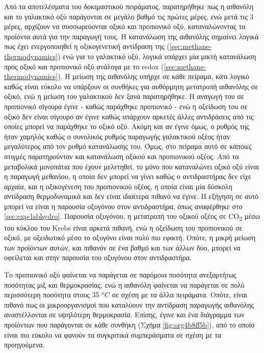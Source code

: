 \documentclass[11pt]{report}
\begin{document}
Από τα αποτελέσματα του δοκιμαστικού πειράματος, παρατηρήθηκε πως η αιθανόλη και το γαλακτικό οξύ παράγονται σε μεγάλο βαθμό τις πρώτες μέρες, ενώ μετά τις 3 μέρες, αρχίζουν να συσσωρεύονται οξικό και προπιονικό οξύ, καταναλώνοντας τα προϊόντα αυτά για την παραγωγή τους. Η κατανάλωση της αιθανόλης σημαίνει λογικά πως έχει ενεργοποιηθεί η οξικογενετική αντίδραση της (\autoref{sec:methane-thermodynamics}) ενώ για το γαλακτικό οξύ, λογικά υπάρχει μία μικτή κατανάλωση προς οξικό και προπιονικό οξύ ανάλογα με το \acrshort{redox} (\autoref{sec:methane-thermodynamics}). Η μείωση της αιθανόλης υπήρχε σε κάθε πείραμα, κάτι λογικό καθώς είναι εύκολο να υπάρξουν οι συνθήκες για αυθόρμητη μετατροπή αιθανόλης σε οξικό, ενώ η μείωση του γαλακτικού δεν ξανά παρατηρήθηκε. Η αναγωγή του σε προπιονικό σίγουρα έγινε - καθώς παράχθηκε προπιονικό - ενώ η οξείδωση του σε οξικό δεν είναι σίγουρο αν έγινε καθώς υπάρχουν αρκετές άλλες αντιδράσεις από τις οποίες μπορεί να παράχθηκε το οξικό οξύ. Ακόμη και αν έγινε όμως, ο ρυθμός της ήταν χαμηλός καθώς ο συνολικός ρυθμός παραγωγής γαλακτικού οξέος ήταν μεγαλύτερος από τον ρυθμό κατανάλωσης του. Όμως, στο πείραμα αυτό σε κάποιες στιγμές παρατηρούνταν και κατανάλωση οξικού και προπιονικού οξέος. Από τα μεταβολικά μονοπάτια που έχουν μελετηθεί, το μόνο που καταναλώνει οξικό οξύ είναι η παραγωγή μεθανίου, η οποία δεν μπορεί να γίνει καθώς ο αντιδραστήρας δεν είχε αρχαία, και η οξικογένεση του προπιονικού οξέος, η οποία είναι μία δύσκολη αντίδραση θερμοδυναμικά και δεν είναι ιδιαίτερα πιθανό να έγινε. Η εξήγηση σε αυτό μπορεί να είναι η παρουσία οξυγόνου στον αντιδραστήρα, όπως αναφέρθηκε στο \autoref{sec:exp-labhydro}. Παρουσία οξυγόνου, η μετατροπή του οξικού οξέος σε CO\textsubscript{2} μέσω του κύκλου του Krebs είναι αρκετά πιθανή, ενώ η οξείδωση του προπιονικού σε οξικό, με οξειδωτικό μέσο το οξυγόνο είναι πολύ πιο εφικτή. Οπότε, η μικρή μείωση των προϊόντων αυτών, και πιθανόν σε ένα βαθμό και των άλλων δύο, μπορεί να οφείλεται και στην παρουσία του οξυγόνου στον αντιδραστήρα.

Το προπιονικό οξύ φαίνεται να παράγεται σε παρόμοια ποσότητα ανεξαρτήτως ποσότητας μιξ και θερμοκρασίας, ενώ η αιθανόλη φαίνεται να παράγεται σε πολύ περισσότερη ποσότητα στους 35 \(^oC\) σε σχέση με τα άλλα πειράματα. Οπότε, είναι πιθανό πως οι μικροοργανισμοί που καταλύουν την αντίδραση παραγωγής αιθανόλης αναστέλλονται σε υψηλότερη θερμοκρασία. Επίσης, έγινε και ένα διάγραμμα των προϊόντων που παράγονται σε κάθε συνθήκη (Σχήμα \ref{fig:org4b8ff5b}), από το οποίο είναι πιο εύκολο να φανούν τα συγκριτικά συμπεράσματα σε σχέση με τα προηγούμενα.
\end{document}
